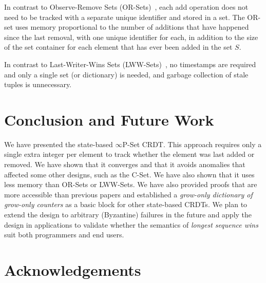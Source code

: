 \documentclass[11pt, oneside]{article}   	%
\begin{document}
In contrast to Observe-Remove Sets (OR-Sets)~\cite{shapiro:inria-00555588}, each add operation does not need to be tracked with a separate unique identifier and stored in a set. The OR-set uses memory proportional to the number of additions that have happened since the last removal, with one unique identifier for each, in addition to the size of the set container for each element that has ever been added in the set $S$.

In contrast to Last-Writer-Wins Sets (LWW-Sets)~\cite{shapiro:inria-00555588}, no timestamps are required and only a single set (or dictionary) is needed, and garbage collection of stale tuples is unnecessary.

%
%
%

%

\section{Conclusion and Future Work}
\label{sec:conclusion}

We have presented the state-based $\infty$P-Set CRDT. This approach requires only a single extra integer per element to track whether the element was last added or removed. We have shown that it converges and that it avoids anomalies that affected some other designs, such as the C-Set. We have also shown that it uses less memory than OR-Sets or LWW-Sets. We have also provided proofs that are more accessible than previous papers and established a \textit{grow-only dictionary of grow-only counters} as a basic block for other state-based CRDTs. We plan to extend the design to arbitrary (Byzantine) failures in the future and apply the design in applications to validate whether the semantics of \textit{longest sequence wins} suit both programmers and end users.

\section{Acknowledgements}
\label{sec:acknowledgements}
\end{document}
